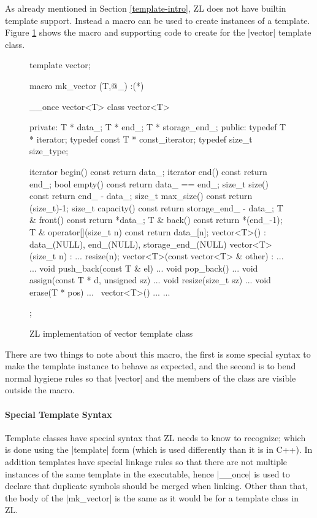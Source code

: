 As already mentioned in Section \ref{template-intro}, ZL does not have builtin
template support.  Instead a macro can be used to create instances of
a template.  Figure \ref{vector-impl} shows the macro and supporting
code to create for the |vector| template class.
\begin{figure}
\begin{codef}
template vector;

macro mk_vector (T,@_) :(*)
{
  __once vector<T>
  class vector<T> {
  private:
    T * data_;
    T * end_;
    T * storage_end_;
  public:
    typedef T * iterator;
    typedef const T * const_iterator;
    typedef size_t size_type;

    iterator begin() const {return data_;}
    iterator end()   const {return end_;}
    bool empty() const {return data_ == end_;}
    size_t size() const {return end_ - data_;}
    size_t max_size() const {return (size_t)-1;}
    size_t capacity() const {return storage_end_ - data_;}
    T & front() const {return *data_;}
    T & back() const {return *(end_-1);}
    T & operator[](size_t n) const {return data_[n];}
    vector<T>() : data_(NULL), end_(NULL), storage_end_(NULL) {}
    vector<T>(size_t n) : ... {resize(n);}
    vector<T>(const vector<T> & other) : ... {...}
    void push_back(const T & el) {...}
    void pop_back() {...}
    void assign(const T * d, unsigned sz) {...}
    void resize(size_t sz) {...}
    void erase(T * pos) {...}
    ~vector<T>() {...}
    ...
  };
}
\end{codef}
\caption{ZL implementation of vector template class}
\label{vector-impl}
\end{figure}

There are two things to note about this macro, the first is some
special syntax to make the template instance to behave as expected,
and the second is to bend normal hygiene rules so that |vector| and the
members of the class are visible outside the macro.

\paragraph{Special Template Syntax}

Template classes have special syntax that ZL needs to know to
recognize; which is done using the |template| form (which is used
differently than it is in C++).  In addition templates have special
linkage rules so that there are not multiple instances of the same
template in the executable, hence |__once| is used to declare that
duplicate symbols should be merged when linking.  Other than that, the
body of the |mk_vector| is the same as it would be for a template
class in ZL.

